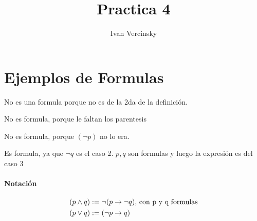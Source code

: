 \documentclass[14pt,a4paper,fleqn]{article}
\date{}
\author{Ivan Vercinsky}
\title{Practica 4}
\begin{document}
\maketitle

\section*{Ejemplos de Formulas}

\begin{description}[font=\bfseries]
\item[$(\neg p)$] No es una formula porque no es de la 2da de la definición.
\item[$p \entonces q $] No es formula, porque le faltan los parentesis
\item[$ \neg ( \neg p ) $] No es formula, porque $(\neg p)$ no lo era.
\item[$\implica{p}{\no{q}}$] Es formula, ya que $\neg q$ es el caso 2. $p, q$ son formulas y luego la expresión es del caso 3
\end{description}

\paragraph*{Notación}
\begin{align*}
	(p \wedge q) &:= \neg (p \rightarrow \neg q) \textnormal{, con p y q formulas} \\
	(p \vee q) &:= (\neg p \rightarrow q)
\end{align*}
\end{document}
